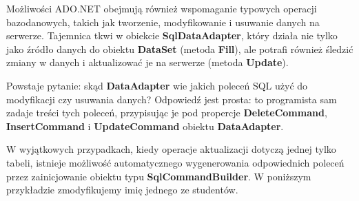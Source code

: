 Możliwości ADO.NET obejmują również wspomaganie typowych operacji bazodanowych, takich
jak tworzenie, modyfikowanie i usuwanie danych na serwerze. Tajemnica tkwi w obiekcie 
{\bf SqlDataAdapter}, który działa nie tylko jako źródło danych do obiektu {\bf DataSet} 
(metoda {\bf Fill}), ale potrafi również śledzić zmiany w danych i aktualizować je na serwerze
(metoda {\bf Update}).

Powstaje pytanie: skąd {\bf DataAdapter} wie jakich poleceń SQL użyć do modyfikacji czy usuwania danych?
Odpowiedź jest prosta: to programista sam zadaje treści tych poleceń, przypisując je pod propercje
{\bf DeleteCommand}, {\bf InsertCommand} i {\bf UpdateCommand} obiektu {\bf DataAdapter}.

W wyjątkowych przypadkach, kiedy operacje aktualizacji dotyczą jednej tylko tabeli, istnieje
możliwość automatycznego wygenerowania odpowiednich poleceń przez zainicjowanie obiektu
typu {\bf SqlCommandBuilder}. W poniższym przykładzie zmodyfikujemy imię jednego ze studentów.

